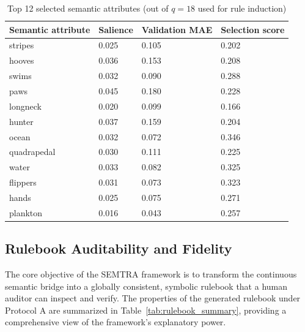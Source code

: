 \documentclass[make,article,submit,pdftex,moreauthors]{Definitions/mdpi}
\begin{document}
\begin{table}[!ht]
\caption{Top 12 selected semantic attributes (out of $q=18$ used for rule induction)\label{tab:selected_attributes}}
\centering
\begin{tabularx}{\textwidth}{L l l l}
\toprule
\textbf{Semantic attribute} & \textbf{Salience} & \textbf{Validation MAE} & \textbf{Selection score} \\
\midrule
stripes & 0.025 & 0.105 & 0.202 \\
hooves & 0.036 & 0.153 & 0.208 \\
swims & 0.032 & 0.090 & 0.288 \\
paws & 0.045 & 0.180 & 0.228 \\
longneck & 0.020 & 0.099 & 0.166 \\
hunter & 0.037 & 0.159 & 0.204 \\
ocean & 0.032 & 0.072 & 0.346 \\
quadrapedal & 0.030 & 0.111 & 0.225 \\
water & 0.033 & 0.082 & 0.325 \\
flippers & 0.031 & 0.073 & 0.323 \\
hands & 0.025 & 0.075 & 0.271 \\
plankton & 0.016 & 0.043 & 0.257 \\
\bottomrule
\end{tabularx}
\end{table}

\subsection{Rulebook Auditability and Fidelity}
\label{subsec:rulebook_auditability}

The core objective of the SEMTRA framework is to transform the continuous semantic bridge into a globally consistent, symbolic rulebook that a human auditor can inspect and verify. The properties of the generated rulebook under Protocol A are summarized in Table~\ref{tab:rulebook_summary}, providing a comprehensive view of the framework's explanatory power.
\end{document}
